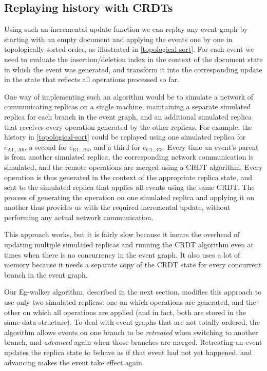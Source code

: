 \documentclass[sigplan,10pt]{acmart}
\newcommand{\algname}{Eg-walker\xspace}
\begin{document}
\subsection{Replaying history with CRDTs}\label{crdt-replay}

Using such an incremental update function we can replay any event graph by starting with an empty document and applying the events one by one in topologically sorted order, as illustrated in \autoref{topological-sort}.
For each event we need to evaluate the insertion/deletion index in the context of the document state in which the event was generated, and transform it into the corresponding update in the state that reflects all operations processed so far.

One way of implementing such an algorithm would be to simulate a network of communicating replicas on a single machine, maintaining a separate simulated replica for each branch in the event graph, and an additional simulated replica that receives every operation generated by the other replicas.
For example, the history in \autoref{topological-sort} could be replayed using one simulated replica for $e_\mathrm{A1\dots A6}$, a second for $e_\mathrm{B1\dots B4}$, and a third for $e_\mathrm{C1\dots C3}$.
Every time an event's parent is from another simulated replica, the corresponding network communication is simulated, and the remote operations are merged using a CRDT algorithm.
Every operation is thus generated in the context of the appropriate replica state, and sent to the simulated replica that applies all events using the same CRDT.
The process of generating the operation on one simulated replica and applying it on another thus provides us with the required incremental update, without performing any actual network communication.

This approach works, but it is fairly slow because it incurs the overhead of updating multiple simulated replicas and running the CRDT algorithm even at times when there is no concurrency in the event graph.
It also uses a lot of memory because it needs a separate copy of the CRDT state for every concurrent branch in the event graph.

Our \algname algorithm, described in the next section, modifies this approach to use only two simulated replicas: one on which operations are generated, and the other on which all operations are applied (and in fact, both are stored in the same data structure).
To deal with event graphs that are not totally ordered, the algorithm allows events on one branch to be \emph{retreated} when switching to another branch, and \emph{advanced} again when those branches are merged.
Retreating an event updates the replica state to behave as if that event had not yet happened, and advancing makes the event take effect again.
\end{document}
